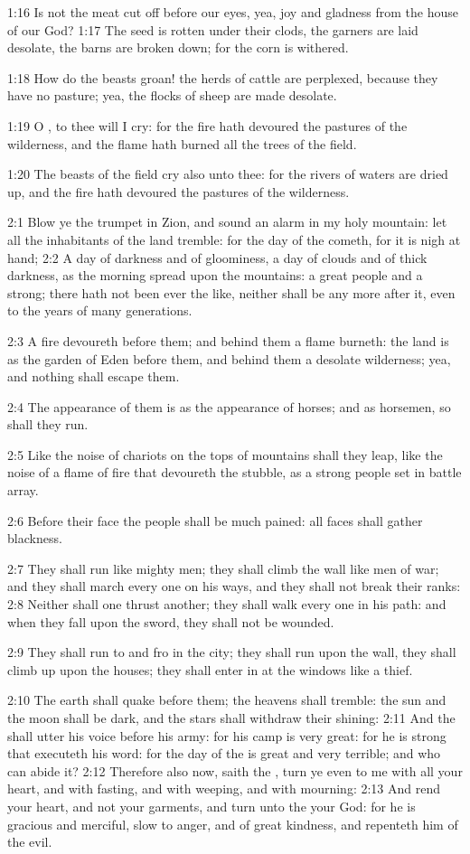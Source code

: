 1:16 Is not the meat cut off before our eyes, yea, joy and gladness
from the house of our God?  1:17 The seed is rotten under their clods,
the garners are laid desolate, the barns are broken down; for the corn
is withered.

1:18 How do the beasts groan! the herds of cattle are perplexed,
because they have no pasture; yea, the flocks of sheep are made
desolate.

1:19 O \LORD, to thee will I cry: for the fire hath devoured the
pastures of the wilderness, and the flame hath burned all the trees of
the field.

1:20 The beasts of the field cry also unto thee: for the rivers of
waters are dried up, and the fire hath devoured the pastures of the
wilderness.

2:1 Blow ye the trumpet in Zion, and sound an alarm in my holy
mountain: let all the inhabitants of the land tremble: for the day of
the \LORD cometh, for it is nigh at hand; 2:2 A day of darkness and of
gloominess, a day of clouds and of thick darkness, as the morning
spread upon the mountains: a great people and a strong; there hath not
been ever the like, neither shall be any more after it, even to the
years of many generations.

2:3 A fire devoureth before them; and behind them a flame burneth: the
land is as the garden of Eden before them, and behind them a desolate
wilderness; yea, and nothing shall escape them.

2:4 The appearance of them is as the appearance of horses; and as
horsemen, so shall they run.

2:5 Like the noise of chariots on the tops of mountains shall they
leap, like the noise of a flame of fire that devoureth the stubble, as
a strong people set in battle array.

2:6 Before their face the people shall be much pained: all faces shall
gather blackness.

2:7 They shall run like mighty men; they shall climb the wall like men
of war; and they shall march every one on his ways, and they shall not
break their ranks: 2:8 Neither shall one thrust another; they shall
walk every one in his path: and when they fall upon the sword, they
shall not be wounded.

2:9 They shall run to and fro in the city; they shall run upon the
wall, they shall climb up upon the houses; they shall enter in at the
windows like a thief.

2:10 The earth shall quake before them; the heavens shall tremble: the
sun and the moon shall be dark, and the stars shall withdraw their
shining: 2:11 And the \LORD shall utter his voice before his army: for
his camp is very great: for he is strong that executeth his word: for
the day of the \LORD is great and very terrible; and who can abide it?
2:12 Therefore also now, saith the \LORD, turn ye even to me with all
your heart, and with fasting, and with weeping, and with mourning:
2:13 And rend your heart, and not your garments, and turn unto the
\LORD your God: for he is gracious and merciful, slow to anger, and of
great kindness, and repenteth him of the evil.

